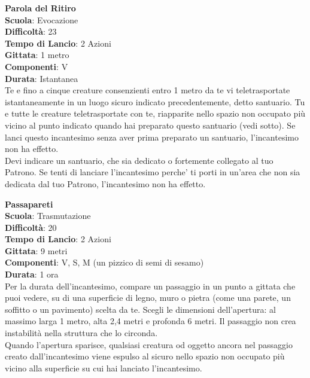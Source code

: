 \begin{multicols}{2}
\medskip\textbf{Parola del Ritiro}\\
\textbf{Scuola}: Evocazione\\
\textbf{Difficoltà}: 23\\
\textbf{Tempo di Lancio}: 2 Azioni\\
\textbf{Gittata}: 1 metro\\
\textbf{Componenti}: V\\
\textbf{Durata}: Istantanea\\
Te e fino a cinque creature consenzienti entro 1 metro da te vi teletrasportate istantaneamente in un luogo sicuro indicato precedentemente, detto santuario. Tu e tutte le creature teletrasportate con te, riapparite nello spazio non occupato più vicino al punto indicato quando hai preparato questo santuario (vedi sotto). Se lanci questo incantesimo senza aver prima preparato un santuario, l'incantesimo non ha effetto.\\
Devi indicare un santuario, che sia dedicato o fortemente collegato al tuo Patrono. Se tenti di lanciare l'incantesimo perche' ti porti in un'area che non sia dedicata dal tuo Patrono, l'incantesimo non ha effetto.

\medskip\textbf{Passapareti}\\
\textbf{Scuola}: Trasmutazione\\
\textbf{Difficoltà}: 20\\
\textbf{Tempo di Lancio}: 2 Azioni\\
\textbf{Gittata}: 9 metri\\
\textbf{Componenti}: V, S, M (un pizzico di semi di sesamo)\\
\textbf{Durata}: 1 ora\\
Per la durata dell'incantesimo, compare un passaggio in un punto a gittata che puoi vedere, su di una superficie di legno, muro o pietra (come una parete, un soffitto o un pavimento) scelta da te. Scegli le dimensioni dell'apertura: al massimo larga 1 metro, alta 2,4 metri e profonda 6 metri. Il passaggio non crea instabilità nella struttura che lo circonda.\\
Quando l'apertura sparisce, qualsiasi creatura od oggetto ancora nel passaggio creato dall'incantesimo viene espulso al sicuro nello spazio non occupato più vicino alla superficie su cui hai lanciato l'incantesimo.


\end{multicols}
